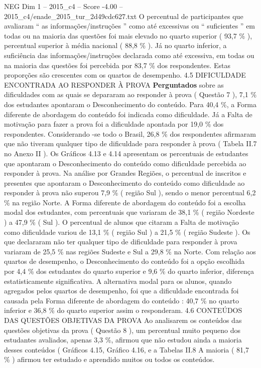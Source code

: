 \begin{textsample}{NEG Dim 1 – 2015\_c4 – Score -4.00 – 2015\_c4/enade\_2015\_tur\_2d49cdc627.txt}
O percentual de participantes que avaliaram “ as informações/instruções ” como até excessivas ou “ suficientes ” em todas ou na maioria das questões foi mais elevado no quarto superior ( 93,7 \% ), percentual superior à média nacional ( 88,8 \% ).
Já no quarto inferior, a suficiência das informações/instruções declarada como até excessiva, em todas ou na maioria das questões foi percebida por 83,7 \% dos respondentes.
Estas proporções são crescentes com os quartos de desempenho. 4.5 DIFICULDADE ENCONTRADA AO RESPONDER À PROVA \textbf{Perguntados} sobre as dificuldades com as quais se depararam ao responder à prova ( Questão 7 ), 7,1 \% dos estudantes apontaram o Desconhecimento do conteúdo.
Para 40,4 \%, a Forma diferente de abordagem do conteúdo foi indicada como dificuldade.
Já a Falta de motivação para fazer a prova foi a dificuldade apontada por 19,0 \% dos respondentes.
Considerando -se todo o Brasil, 26,8 \% dos respondentes afirmaram que não tiveram qualquer tipo de dificuldade para responder à prova ( Tabela II.7 no Anexo II ).
Os Gráficos 4.13 e 4.14 apresentam os percentuais de estudantes que apontaram o Desconhecimento do conteúdo como dificuldade percebida ao responder à prova.
Na análise por Grandes Regiões, o percentual de inscritos e presentes que apontaram o Desconhecimento do conteúdo como dificuldade ao responder à prova não superou 7,9 \% ( região Sul ), sendo o menor percentual 6,2 \% na região Norte.
A Forma diferente de abordagem do conteúdo foi a escolha modal dos estudantes, com percentuais que variaram de 38,1 \% ( região Nordeste ) a 47,9 \% ( Sul ).
O percentual de alunos que citaram a Falta de motivação como dificuldade variou de 13,1 \% ( região Sul ) a 21,5 \% ( região Sudeste ).
Os que declararam não ter qualquer tipo de dificuldade para responder à prova variaram de 25,5 \% nas regiões Sudeste e Sul a 29,8 \% na Norte.
Com relação aos quartos de desempenho, o Desconhecimento do conteúdo foi a opção escolhida por 4,4 \% dos estudantes do quarto superior e 9,6 \% do quarto inferior, diferença estatisticamente significativa.
A alternativa modal para os alunos, quando agregados pelos quartos de desempenho, foi que a dificuldade encontrada foi causada pela Forma diferente de abordagem do conteúdo : 40,7 \% no quarto inferior e 36,8 \% do quarto superior assim o responderam. 4.6 CONTEÚDOS DAS QUESTÕES OBJETIVAS DA PROVA Ao analisarem os conteúdos das questões objetivas da prova ( Questão 8 ), um percentual muito pequeno dos estudantes avaliados, apenas 3,3 \%, afirmou que não estudou ainda a maioria desses conteúdos ( Gráficos 4.15, Gráfico 4.16, e a Tabelas II.8 A maioria ( 81,7 \% ) afirmou ter estudado e aprendido muitos ou todos os conteúdos.

\end{textsample}
